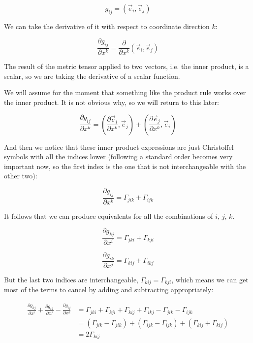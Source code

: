 \begin{equation}
g_{ij} = \left( \vec{e}_i,\vec{e}_j \right)
\end{equation}

We can take the derivative of it with respect to coordinate direction $k$:

\begin{equation}
\frac{\partial g_{ij}}{\partial x^k} 
=
\frac{\partial}{\partial x^k}
\left(
\vec{e}_i,\vec{e}_j
 \right)
\end{equation}

The result of the metric tensor applied to two vectors, i.e. the inner product, is a scalar, so we are taking the derivative of a scalar function.

We will assume for the moment that something like the product rule works over the inner product. It is not obvious why, so we will return to this later:

\begin{equation}
\frac{\partial g_{ij}}{\partial x^k} 
=
\left(
\frac{\partial \vec{e}_i}{\partial x^k}
,\vec{e}_j
 \right)
+
\left(
\frac{\partial \vec{e}_j}{\partial x^k}
,\vec{e}_i
 \right)
\end{equation}

And then we notice that these inner product expressions are just Christoffel symbols with all the indices lower (following a standard order becomes very important now, so the first index is the one that is not interchangeable with the other two):

\begin{equation}
\frac{\partial g_{ij}}{\partial x^k} 
=
\Gamma_{jik}+\Gamma_{ijk}
\end{equation}

It follows that we can produce equivalents for all the combinations of $i$, $j$, $k$.

\begin{equation}
\frac{\partial g_{kj}}{\partial x^i} 
=
\Gamma_{jki}+\Gamma_{kji}
\end{equation}

\begin{equation}
\frac{\partial g_{ik}}{\partial x^j} 
=
\Gamma_{kij}+\Gamma_{ikj}
\end{equation}

But the last two indices are interchangeable, $\Gamma_{kij} = \Gamma_{kji}$, which means we can get most of the terms to cancel by adding and subtracting appropriately:

\begin{equation}
    \begin{split}
        \frac{\partial g_{kj}}{\partial x^i} 
        +
        \frac{\partial g_{ik}}{\partial x^j} 
        -
        \frac{\partial g_{ij}}{\partial x^k}
        &=
        \Gamma_{jki}+\Gamma_{kji}
        +
        \Gamma_{kij}+\Gamma_{ikj}
        -
        \Gamma_{jik}-\Gamma_{ijk} \\
        &=        
        (\Gamma_{jik}-\Gamma_{jik})
        +
        (\Gamma_{ijk}-\Gamma_{ijk})
        +
        (\Gamma_{kij}+\Gamma_{kij}) \\
        &= 2\Gamma_{kij}       
    \end{split}
\end{equation}

